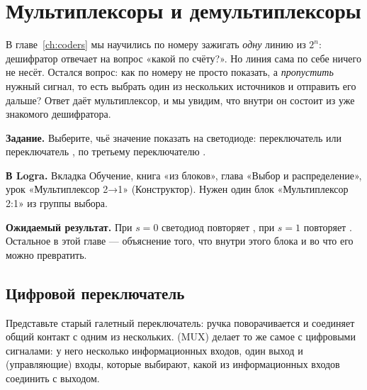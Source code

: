 \chapter{Мультиплексоры и демультиплексоры}
\label{ch:mux}

В главе~\ref{ch:coders} мы научились по номеру зажигать \emph{одну} линию из
$2^n$: дешифратор отвечает на вопрос «какой по счёту?». Но линия сама по себе
ничего не несёт. Остался вопрос: как по номеру не просто показать, а
\emph{пропустить} нужный сигнал, то есть выбрать один из нескольких источников
и отправить его дальше? Ответ даёт мультиплексор, и мы увидим, что внутри он
состоит из уже знакомого дешифратора.

\begin{buildbox}
\textbf{Задание.} Выберите, чьё значение показать на светодиоде: переключатель
 или переключатель , по третьему переключателю .

\textbf{В Logra.} Вкладка Обучение, книга «из блоков», глава «Выбор и
распределение», урок «Мультиплексор 2→1» (Конструктор). Нужен один блок
«Мультиплексор 2:1» из группы выбора.

\textbf{Ожидаемый результат.} При $s=0$ светодиод повторяет , при
$s=1$ повторяет . Остальное в этой главе --- объяснение того, что
внутри этого блока и во что его можно превратить.
\end{buildbox}

\section{Цифровой переключатель}

Представьте старый галетный переключатель: ручка поворачивается и соединяет
общий контакт с одним из нескольких.  (MUX) делает то же
самое с цифровыми сигналами: у него несколько информационных входов, один
выход и  (управляющие) входы, которые выбирают, какой из
информационных входов соединить с выходом.


